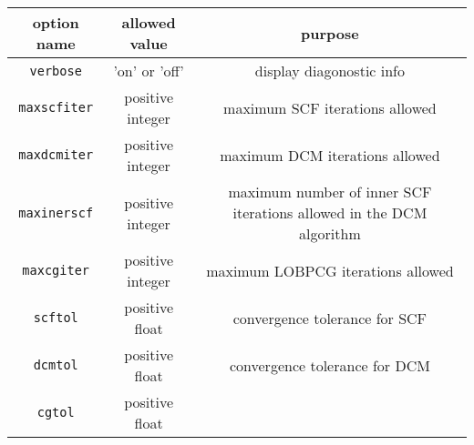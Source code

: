 \documentclass[11pt]{book}
\begin{document}
\begin{table}[htbp]
\center
\begin{tabular}{|c|c|c|} \hline
option name & allowed value & purpose \\ \hline

{\tt verbose} &    'on' or 'off'  &    \begin{minipage}[t]{3in}  
                                       display diagonostic info 
                                       \end{minipage}\\ \hline
{\tt maxscfiter} &  positive integer &    \begin{minipage}[t]{3in}
                                      maximum SCF iterations allowed
                                       \end{minipage}\\ \hline
{\tt maxdcmiter} &  positive integer & \begin{minipage}[t]{3in}
                                      maximum DCM iterations allowed 
                                       \end{minipage}\\ \hline
{\tt maxinerscf} &  positive integer &  \begin{minipage}[t]{3in}
                                       maximum number of inner SCF 
                                       iterations allowed in the DCM 
                                       algorithm
                                       \end{minipage}\\ \hline
{\tt maxcgiter} & positive integer  &   \begin{minipage}[t]{3in}
                                      maximum LOBPCG iterations allowed
                                       \end{minipage}\\ \hline
{\tt scftol} &  positive float &    \begin{minipage}[t]{3in}
                                     convergence tolerance for SCF
                                       \end{minipage}\\ \hline
{\tt dcmtol} &  positive float &    \begin{minipage}[t]{3in}
                                    convergence tolerance for DCM 
                                       \end{minipage}\\ \hline
{\tt cgtol}  &   positive float &    \begin{minipage}[t]{3in}

\end{minipage}
\end{tabular}
\end{table}
\end{document}
